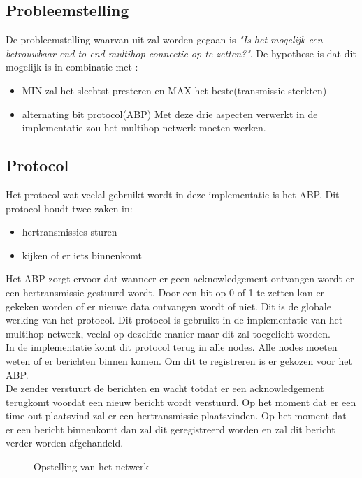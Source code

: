 \documentclass{article}
\begin{document}
\subsection{Probleemstelling}

De probleemstelling waarvan uit zal worden gegaan is \textit{"Is het mogelijk een betrouwbaar end-to-end multihop-connectie op te zetten?"}. De hypothese is dat dit mogelijk is in combinatie met :
\\
\begin{itemize}
	\item MIN zal het slechtst presteren en MAX het beste(transmissie sterkten)
	\item alternating bit protocol(ABP)
	Met deze drie aspecten verwerkt in de implementatie zou het multihop-netwerk moeten werken. 
\end{itemize}
\subsection{Protocol}
Het protocol wat veelal gebruikt wordt in deze implementatie is het ABP. Dit protocol houdt twee zaken in:
\\
\begin{itemize}
	\item hertransmissies sturen
	\item kijken of er iets binnenkomt
\end{itemize}
Het ABP zorgt ervoor dat wanneer er geen acknowledgement ontvangen wordt er een hertransmissie gestuurd wordt. Door een bit op 0 of 1 te zetten kan er gekeken worden of er nieuwe data ontvangen wordt of niet. Dit is de globale werking van het protocol. Dit protocol is gebruikt in de implementatie van het multihop-netwerk, veelal op dezelfde manier maar dit zal toegelicht worden. 
\\ 
In de implementatie komt dit protocol terug in alle nodes.
Alle nodes moeten weten of er berichten binnen komen. Om dit te registreren is er gekozen voor het ABP.\\

De zender verstuurt de berichten en wacht totdat er een acknowledgement terugkomt voordat een nieuw bericht wordt verstuurd. Op het moment dat er een time-out plaatsvind zal er een hertransmissie plaatsvinden. Op het moment dat er een bericht binnenkomt dan zal dit geregistreerd worden en zal dit bericht verder worden afgehandeld.

\begin{figure}
\centering 
 
\caption{Opstelling van het netwerk}
\label{fig:hop} %
\end{figure}
\end{document}

